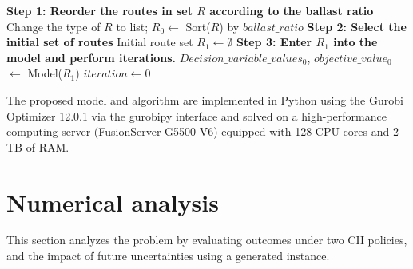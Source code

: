 \documentclass[11pt,english]{article}
\begin{document}
\begin{algorithm}[H]
\label{alg:algorithm}
\SetAlgoLined
\caption{Heuristic Route Search Algorithm}
\textbf{Step 1: Reorder the routes in set $R$ according to the ballast ratio}\;
    Change the type of $R$ to list; $R_0 \leftarrow$ Sort($R$) by $ballast\_ratio$\;
\textbf{Step 2: Select the initial set of routes}\;
    Initial route set $R_1 \leftarrow \emptyset$\;
\textbf{Step 3: Enter $R_1$ into the model and perform iterations.
}\;
    $Decision\_variable\_values_0$, $objective\_value_0$ $\leftarrow$ Model($R_1$)\;
    $iteration \leftarrow 0$\;
\end{algorithm}

The proposed model and algorithm are implemented in Python using the Gurobi Optimizer 12.0.1 via the gurobipy interface and solved on a high-performance computing server (FusionServer G5500 V6) equipped with 128 CPU cores and 2 TB of RAM.


\section{Numerical analysis}
\label{sec:case_study}

This section analyzes the problem by evaluating outcomes under two CII policies, and the impact of future uncertainties using a generated instance.
\end{document}
